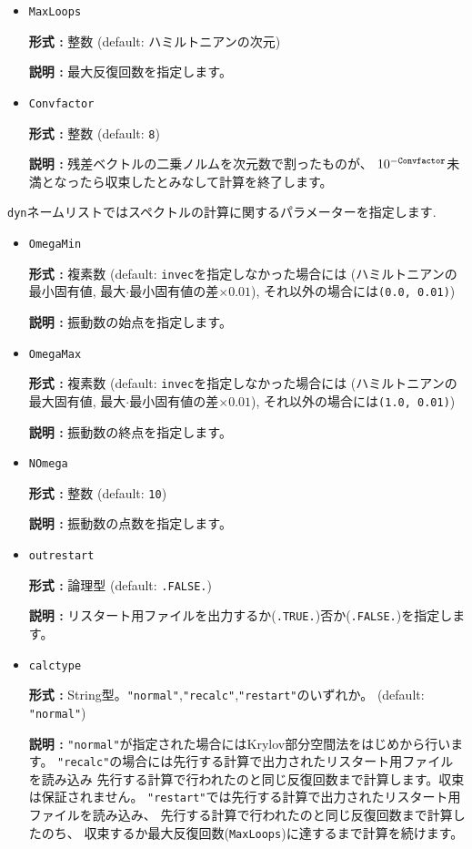 \documentclass[12pt,titlepage]{jarticle}
\begin{document}
\begin{itemize}
\item  \verb|MaxLoops|
  
  {\bf 形式 :} 整数 (default: ハミルトニアンの次元)

  {\bf 説明 :} 最大反復回数を指定します。
  
\item  \verb|Convfactor|
  
  {\bf 形式 :} 整数 (default: \verb|8|)

  {\bf 説明 :} 残差ベクトルの二乗ノルムを次元数で割ったものが、
  $10^{-{\tt Convfactor}}$未満となったら収束したとみなして計算を終了します。
  
\end{itemize}

\verb|dyn|ネームリストではスペクトルの計算に関するパラメーターを指定します.

\begin{itemize}
\item  \verb|OmegaMin|
  
  {\bf 形式 :} 複素数 (default: \verb|invec|を指定しなかった場合には
  (ハミルトニアンの最小固有値, 最大$\cdot$最小固有値の差$\times0.01$),
  それ以外の場合には\verb|(0.0, 0.01)|)

  {\bf 説明 :} 振動数の始点を指定します。
  
\item  \verb|OmegaMax|
  
  {\bf 形式 :} 複素数 (default: \verb|invec|を指定しなかった場合には
  (ハミルトニアンの最大固有値, 最大$\cdot$最小固有値の差$\times0.01$),
  それ以外の場合には\verb|(1.0, 0.01)|)

  {\bf 説明 :} 振動数の終点を指定します。
  
\item  \verb|NOmega|
  
  {\bf 形式 :} 整数 (default: \verb|10|)

  {\bf 説明 :} 振動数の点数を指定します。
  
\item \verb|outrestart|
  
  {\bf 形式 :} 論理型 (default: \verb|.FALSE.|)

  {\bf 説明 :} リスタート用ファイルを出力するか(\verb|.TRUE.|)否か(\verb|.FALSE.|)を指定します。

\item  \verb|calctype|
  
  {\bf 形式 :} String型。\verb|"normal"|,\verb|"recalc"|,\verb|"restart"|のいずれか。
  (default: \verb|"normal"|)

  {\bf 説明 :} \verb|"normal"|が指定された場合にはKrylov部分空間法をはじめから行います。
  \verb|"recalc"|の場合には先行する計算で出力されたリスタート用ファイルを読み込み
  先行する計算で行われたのと同じ反復回数まで計算します。収束は保証されません。
  \verb|"restart"|では先行する計算で出力されたリスタート用ファイルを読み込み、
  先行する計算で行われたのと同じ反復回数まで計算したのち、
  収束するか最大反復回数(\verb|MaxLoops|)に達するまで計算を続けます。

\end{itemize} 
  
\end{document}
